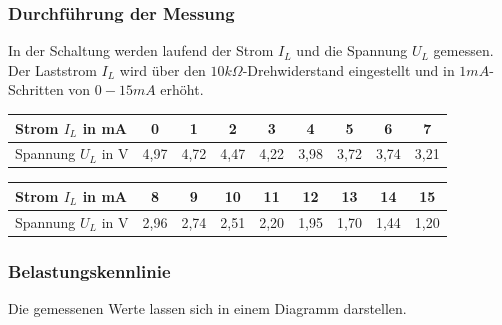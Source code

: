 \documentclass[
a4paper,     %
 headsepline, %
11pt         %
]{scrartcl}  %
\begin{document}
\begin{center}
\end{center}

\subsubsection{Durchführung der Messung}
In der Schaltung werden laufend der Strom $I_L$ und die Spannung $U_L$ gemessen. Der Laststrom $I_L$ wird über den $10k\Omega$-Drehwiderstand eingestellt und in $1mA$-Schritten von $0-15mA$ erhöht.
\begin{center}
  \begin{tabular}{ l | c | c | c | c | c | c | c | c }
    \hline
    Strom $I_L$ in mA   & 0    & 1    & 2    & 3    & 4    & 5    & 6    & 7   \\ \hline
    Spannung $U_L$ in V & 4,97 & 4,72 & 4,47 & 4,22 & 3,98 & 3,72 & 3,74 & 3,21 \\
    \hline
  \end{tabular}
  \begin{tabular}{ l | c | c | c | c | c | c | c | c  }
    \hline
    Strom $I_L$ in mA    & 8    & 9    & 10   & 11   & 12   & 13   & 14   & 15 \\ \hline
    Spannung $U_L$ in V  & 2,96 & 2,74 & 2,51 & 2,20 & 1,95 & 1,70 & 1,44 & 1,20 \\
    \hline
  \end{tabular}
\end{center}

\subsubsection{Belastungskennlinie}
Die gemessenen Werte lassen sich in einem Diagramm darstellen.
\end{document}
